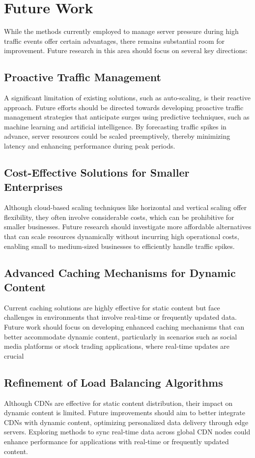 \documentclass{article}
\begin{document}
\section{Future Work}
While the methods currently employed to manage server pressure during high traffic events offer certain advantages, there remains substantial room for improvement. Future research in this area should focus on several key directions:
\subsection{Proactive Traffic Management}
 A significant limitation of existing solutions, such as auto-scaling, is their reactive approach. Future efforts should be directed towards developing proactive traffic management strategies that anticipate surges using predictive techniques, such as machine learning and artificial intelligence. By forecasting traffic spikes in advance, server resources could be scaled preemptively, thereby minimizing latency and enhancing performance during peak periods.

\subsection{Cost-Effective Solutions for Smaller Enterprises}
Although cloud-based scaling techniques like horizontal and vertical scaling offer flexibility, they often involve considerable costs, which can be prohibitive for smaller businesses. Future research should investigate more affordable alternatives that can scale resources dynamically without incurring high operational costs, enabling small to medium-sized businesses to efficiently handle traffic spikes.
\subsection{Advanced Caching Mechanisms for Dynamic Content}
Current caching solutions are highly effective for static content but face challenges in environments that involve real-time or frequently updated data. Future work should focus on developing enhanced caching mechanisms that can better accommodate dynamic content, particularly in scenarios such as social media platforms or stock trading applications, where real-time updates are crucial
\subsection{Refinement of Load Balancing Algorithms}
Although CDNs are effective for static content distribution, their impact on dynamic content is limited. Future improvements should aim to better integrate CDNs with dynamic content, optimizing personalized data delivery through edge servers. Exploring methods to sync real-time data across global CDN nodes could enhance performance for applications with real-time or frequently updated content.
\end{document}
